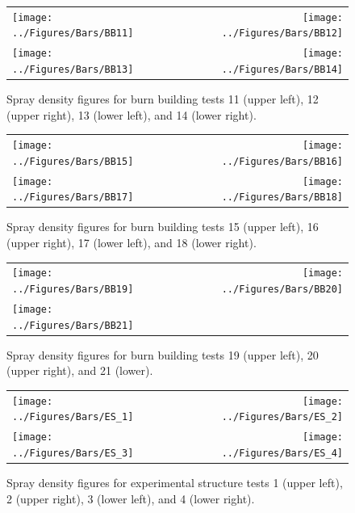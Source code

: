 \documentclass[12pt,oneside]{book}
\begin{document}
\clearpage

\begin{figure}[ht]
\begin{tabular*}{\textwidth}{lr}
\texttt{[image: ../Figures/Bars/BB11]} &
\texttt{[image: ../Figures/Bars/BB12]} \\
\texttt{[image: ../Figures/Bars/BB13]} &
\texttt{[image: ../Figures/Bars/BB14]}
\end{tabular*}
\caption{Spray density figures for burn building tests 11 (upper left), 12 (upper right), 13 (lower left), and 14 (lower right).}
\label{fig:bb_11_14}
\end{figure}

\clearpage

\begin{figure}[ht]
\begin{tabular*}{\textwidth}{lr}
\texttt{[image: ../Figures/Bars/BB15]} &
\texttt{[image: ../Figures/Bars/BB16]} \\
\texttt{[image: ../Figures/Bars/BB17]} &
\texttt{[image: ../Figures/Bars/BB18]}
\end{tabular*}
\caption{Spray density figures for burn building tests 15 (upper left), 16 (upper right), 17 (lower left), and 18 (lower right).}
\label{fig:bb_15_18}
\end{figure}

\clearpage

\begin{figure}[ht]
\begin{tabular*}{\textwidth}{lr}
\texttt{[image: ../Figures/Bars/BB19]} &
\texttt{[image: ../Figures/Bars/BB20]} \\
\texttt{[image: ../Figures/Bars/BB21]} \\
\end{tabular*}
\caption{Spray density figures for burn building tests 19 (upper left), 20 (upper right), and 21 (lower).}
\label{fig:bb_19_21}
\end{figure}

\clearpage

\begin{figure}[ht]
\begin{tabular*}{\textwidth}{lr}
\texttt{[image: ../Figures/Bars/ES\_1]} &
\texttt{[image: ../Figures/Bars/ES\_2]} \\
\texttt{[image: ../Figures/Bars/ES\_3]} &
\texttt{[image: ../Figures/Bars/ES\_4]}
\end{tabular*}
\caption{Spray density figures for experimental structure tests 1 (upper left), 2 (upper right), 3 (lower left), and 4 (lower right).}
\label{fig:es_1_4}
\end{figure}
\end{document}

